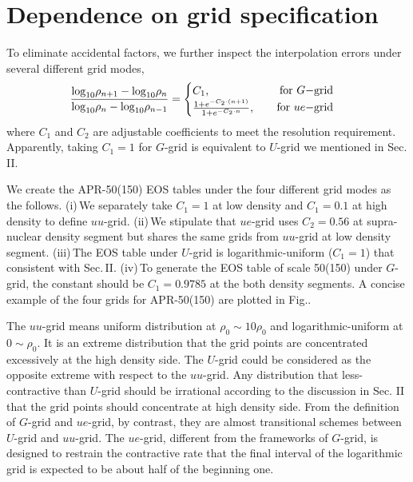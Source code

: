 \documentclass[preprint,tightenlines,eqsecnum,floats,aps,amsmath,amssymb,nofootinbib,prd,showpacs]{revtex4}
\begin{document}
\section{Dependence on grid specification}

To eliminate accidental factors, we further inspect the interpolation errors under several different grid modes,
\begin{alignat}{2} \label{Def_grid}
& \frac{{{{\log }_{10}}{\rho _{n + 1}} - {{\log }_{10}}{\rho _n}}}{{{{\log }_{10}}{\rho _n} - {{\log }_{10}}{\rho _{n - 1}}}}= \begin{cases}  {C_1} , \\   {\frac{{1 + {e^{ - {C_2} \cdot (n + 1)}}}}{{1 + {e^{ - {C_2} \cdot n}}}}} , \end{cases}
& &
\begin{aligned}
\text{for } {G{\rm{ - grid}}} \\
\text{for } {ue{\rm{ - grid}}}
\end{aligned}
\end{alignat}
where $C_1$ and $C_2$ are adjustable coefficients to meet the resolution requirement. Apparently, taking $C_1=1$ for $G$-grid is equivalent to $U$-grid we mentioned in Sec.$\,$II.

We create the APR-50(150) EOS tables under the four different grid modes as the follows. (i)$\,$We separately take $C_1=1$ at low density and $C_1=0.1$ at high density to define $uu$-grid. (ii)$\,$We stipulate that $ue$-grid uses $C_2=0.56$ at supra-nuclear density segment but shares the same grids from $uu$-grid at low density segment. (iii)$\,$The EOS table under $U$-grid is logarithmic-uniform ($C_1=1$) that consistent with Sec.$\,$II. (iv)$\,$To generate the EOS table of scale 50(150) under $G$-grid, the constant should be $C_1=0.9785$ at the both density segments. A concise example of the four grids for APR-50(150) are plotted in Fig..


The $uu$-grid means uniform distribution at $\rho_0 \sim 10\rho_0$ and logarithmic-uniform at $0 \sim \rho_0$. It is an extreme distribution that the grid points are concentrated excessively at the high density side. The $U$-grid could be considered as the opposite extreme with respect to the $uu$-grid. Any distribution that less-contractive than $U$-grid should be irrational according to the discussion in Sec. II that the grid points should concentrate at high density side. From the definition of $G$-grid and $ue$-grid, by contrast, they are almost transitional schemes between $U$-grid and $uu$-grid. The $ue$-grid, different from the frameworks of $G$-grid, is designed to restrain the contractive rate that the final interval of the logarithmic grid is expected to be about half of the beginning one.
\end{document}
